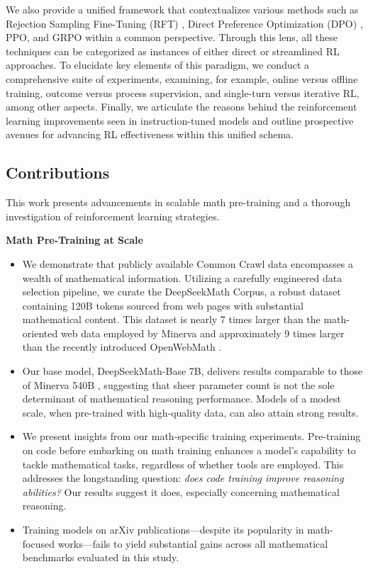 We also provide a unified framework that contextualizes various methods such as Rejection Sampling Fine-Tuning (RFT) \citep{yuan2023scaling}, Direct Preference Optimization (DPO) \citep{dpo}, PPO, and GRPO within a common perspective. Through this lens, all these techniques can be categorized as instances of either direct or streamlined RL approaches. To elucidate key elements of this paradigm, we conduct a comprehensive suite of experiments, examining, for example, online versus offline training, outcome versus process supervision, and single-turn versus iterative RL, among other aspects. Finally, we articulate the reasons behind the reinforcement learning improvements seen in instruction-tuned models and outline prospective avenues for advancing RL effectiveness within this unified schema.

\subsection{Contributions}
This work presents advancements in scalable math pre-training and a thorough investigation of reinforcement learning strategies.

\textbf{Math Pre-Training at Scale}

\begin{itemize}[topsep=0pt]
    \item We demonstrate that publicly available Common Crawl data encompasses a wealth of mathematical information. Utilizing a carefully engineered data selection pipeline, we curate the DeepSeekMath Corpus, a robust dataset containing 120B tokens sourced from web pages with substantial mathematical content. This dataset is nearly 7 times larger than the math-oriented web data employed by Minerva \citep{minerva} and approximately 9 times larger than the recently introduced OpenWebMath \citep{openwebmath}.

    \item Our base model, DeepSeekMath-Base 7B, delivers results comparable to those of Minerva 540B \citep{minerva}, suggesting that sheer parameter count is not the sole determinant of mathematical reasoning performance. Models of a modest scale, when pre-trained with high-quality data, can also attain strong results.

    \item We present insights from our math-specific training experiments. Pre-training on code before embarking on math training enhances a model’s capability to tackle mathematical tasks, regardless of whether tools are employed. This addresses the longstanding question: \textit{does code training improve reasoning abilities?} Our results suggest it does, especially concerning mathematical reasoning.

    \item Training models on arXiv publications—despite its popularity in math-focused works—fails to yield substantial gains across all mathematical benchmarks evaluated in this study.
\end{itemize}

